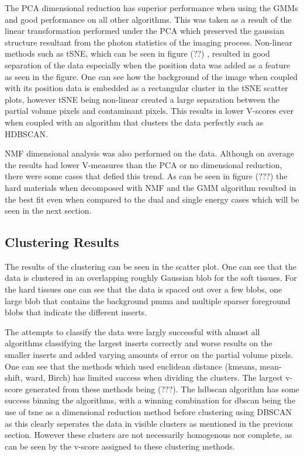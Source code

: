 \documentclass[journal, a4paper]{IEEEtran}
\begin{document}
The PCA dimensional reduction has superior performance when using the GMMs and good performance on all other algorithms. This was taken as a result of the linear transformation performed under the PCA which preserved the gaussian structure resultant from the photon statistics of the imaging process. Non-linear methods such as tSNE, which can be seen in figure (??) , resulted in good separation of the data especially when the position data was added as a feature as seen in the figure. One can see how the background of the image when coupled with its position data is embedded as a rectangular cluster in the tSNE scatter plots, however tSNE being non-linear created a large separation between the partial volume pixels and contaminant pixels. This results in lower V-scores ever when coupled with an algorithm that clusters the data perfectly such as HDBSCAN.

NMF dimensional analysis was also performed on the data. Although on average the results had lower V-measures than the PCA or no dimensional reduction, there were some cases that defied this trend. As can be seen in figure (???) the hard materials when decomposed with NMF and the GMM algorithm resulted in the best fit even when compared to the dual and single energy cases which will be seen in the next section.


\subsection{Clustering Results}


The results of the clustering can be seen in the scatter plot. One can see that the data is clustered in an overlapping roughly Gaussian blob for the soft tissues. For the hard tissues one can see that the data is spaced out over a few blobs, one large blob that contains the background pmma and multiple sparser foreground blobs that indicate the different inserts.

The attempts to classify the data were largly successful with almost all algorithms classifying the largest inserts correctly and worse results on the smaller inserts and added varying amounts of error on the partial volume pixels. One can see that the methods which used euclidean distance (kmeans, mean-shift, ward, Birch) has limited success when dividing the clusters. The largest v-score generated from these methods being (???). The hdbscan algorithm has some success binning the algorithms, with a winning combination for dbscan being the use of tsne as a dimensional reduction method before clustering using DBSCAN as this clearly seperates the data in visible clusters as mentioned in the previous section. However these clusters are not necessarily homogenous nor complete, as can be seen by the v-score assigned to these clustering methods.
\end{document}
